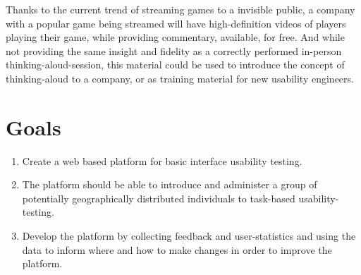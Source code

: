   Thanks to the current trend of streaming games to a invisible public, a
  company with a popular game being streamed will have high-definition videos
  of players playing their game, while providing commentary, available, for
  free. And while not providing the same insight and fidelity as a correctly
  performed in-person thinking-aloud-session, this material could be used to
  introduce the concept of thinking-aloud to a company, or as training
  material for new usability
  engineers\cite{citeYouTubeGamersandThinkAloudProtocolsIntroducingUsabilityTesting}.

\section{Goals}


  \begin{enumerate}
    \item{
      Create a web based platform for basic interface usability testing.
    }
    \item {
      The platform should be able to introduce and administer a group of
      potentially geographically distributed individuals to task-based
      usability-testing.
    }
    \item{
      Develop the platform by collecting feedback and user-statistics and using
      the data to inform where and how to make changes in order to improve the
      platform.
    }
  \end{enumerate}
%
%
%
%
%
